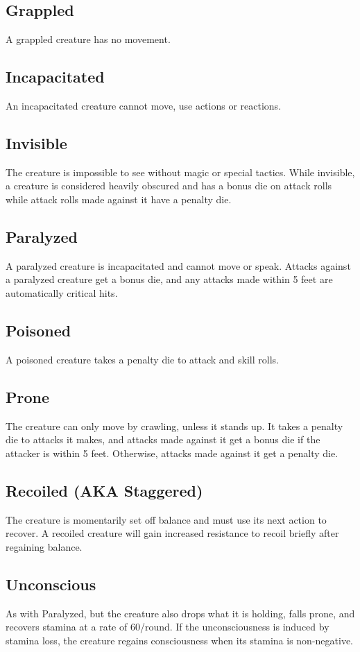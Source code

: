 \subsection{Grappled}
A grappled creature has no movement.

\subsection{Incapacitated}
An incapacitated creature cannot move, use actions or reactions.

\subsection{Invisible}
The creature is impossible to see without magic or special tactics. While invisible, a creature is considered heavily obscured and has a bonus die on attack rolls while attack rolls made against it have a penalty die.

\subsection{Paralyzed}
A paralyzed creature is incapacitated and cannot move or speak. Attacks against a paralyzed creature get a bonus die, and any attacks made within 5 feet are automatically critical hits.

\subsection{Poisoned}
A poisoned creature takes a penalty die to attack and skill rolls.

\subsection{Prone}
The creature can only move by crawling, unless it stands up. It takes a penalty die to attacks it makes, and attacks made against it get a bonus die if the attacker is within 5 feet. Otherwise, attacks made against it get a penalty die.

\subsection{Recoiled (AKA Staggered)}
The creature is momentarily set off balance and must use its next action to recover. A recoiled creature will gain increased resistance to recoil briefly after regaining balance.

\subsection{Unconscious}
As with Paralyzed, but the creature also drops what it is holding, falls prone, and recovers stamina at a rate of 60/round. If the unconsciousness is induced by stamina loss, the creature regains consciousness when its stamina is non-negative.
